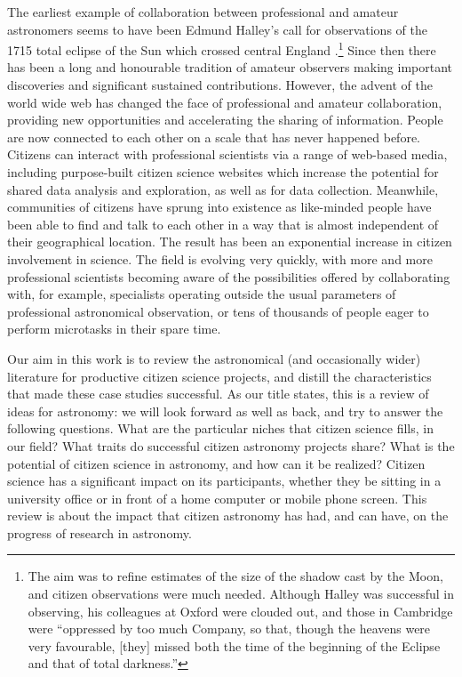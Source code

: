 \documentclass{ar2e}
\begin{document}
The earliest
example of collaboration between professional and amateur astronomers seems to
have been Edmund Halley's call for observations of the 1715 total eclipse of the
Sun which crossed central England \citep{Halley}.\footnote{The aim was to refine
estimates of the size of the shadow cast by the Moon, and citizen observations
were much needed. Although Halley was successful in observing, his colleagues at
Oxford were clouded out, and those in Cambridge were ``oppressed by too much
Company, so that, though the heavens were very favourable, [they] missed both
the time of the beginning of the Eclipse and that of total darkness.''}  Since
then there has been a long and honourable tradition of amateur observers
making important discoveries and significant sustained contributions. However,
the advent of the world wide web has changed the face of professional and
amateur collaboration, providing new opportunities and accelerating the sharing
of information. People are now connected to each other on a scale that has never
happened before. Citizens can interact with professional scientists via a range
of web-based media, including purpose-built citizen science websites which
increase the potential for shared data analysis and exploration, as well as for
data collection. Meanwhile, communities of citizens have sprung into existence
as like-minded people have been able to find and talk to each other in a way
that is almost independent of their geographical location. The result has been
an exponential increase in citizen involvement in science. The field is evolving
very quickly, with more and more professional scientists becoming aware of the
possibilities offered by collaborating with, for example, specialists operating
outside the usual parameters of professional astronomical observation, or tens
of thousands of people eager to perform microtasks in their spare time.  

Our aim in this work is to review the astronomical (and occasionally wider)
literature for productive citizen science projects, and distill the
characteristics that made these case studies successful.  As our title states,
this is a review of ideas for astronomy: we will look forward as well as back,
and try to answer the following questions. What are the particular niches that
citizen science fills, in our field? What traits do successful citizen astronomy
projects share? What is the potential of citizen science in
astronomy, and how can it be realized?  Citizen science has a significant impact
on its participants,  whether they be sitting in a university office or in front
of a home computer or mobile phone screen. This review is about the impact that
citizen astronomy has had, and can have, on the progress of  research in
astronomy.
\end{document}
